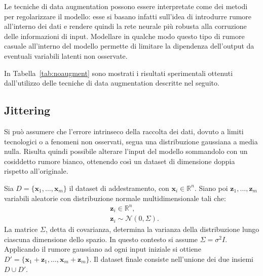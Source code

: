 Le tecniche di data augmentation possono essere interpretate come dei metodi
per regolarizzare il modello: esse si basano infatti sull'idea di introdurre rumore
all'interno dei dati e rendere quindi la rete neurale più robusta alla
corruzione delle informazioni di input. Modellare in qualche modo questo tipo
di rumore casuale all'interno del modello permette di limitare la dipendenza
dell'output da eventuali variabili latenti non osservate.

In Tabella~\ref{tab:noaugment} sono mostrati i risultati sperimentali ottenuti
dall'utilizzo delle tecniche di data augmentation descritte nel seguito.


\subsection{Jittering}
Si può assumere che l'errore intrinseco della raccolta dei dati, dovuto a
limiti tecnologici o a fenomeni non osservati, segua una distribuzione
gaussiana a media nulla. Risulta quindi possibile alterare l'input del
modello sommandolo con un cosiddetto rumore bianco, ottenendo così un dataset
di dimensione doppia rispetto all'originale. 

Sia \(D = \{\bm x_1, \dotsc, \bm x_m\}\) il dataset di addestramento, con 
\(\bm x_i \in \mathbb{R}^n \). Siano poi \(\bm z_1,
  \dotsc, \bm z_m \) variabili aleatorie con distribuzione normale
multidimensionale tali che: 
\begin{align*}
& \bm z_i \in \mathbb{R}^n, \\ 
& \bm z_i \sim \mathcal{N}(0, \Sigma).
\end{align*}
La matrice \(\Sigma\), detta di covarianza, determina la varianza della
distribuzione lungo ciascuna dimensione dello spazio. In questo contesto si
assume \(\Sigma=\sigma^2I\). Applicando il rumore gaussiano ad ogni input
iniziale si ottiene \(D' = \{\bm x_1 + \bm z_1, \dotsc, \bm x_m + \bm z_m\}\).
Il dataset finale consiste nell'unione dei due insiemi \( D \cup D'\).

